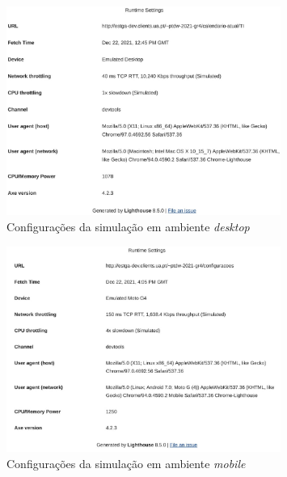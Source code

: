 \documentclass[11pt, twoside]{report}
\begin{document}
			\begin{figure}[H] 
				\centering 							\includegraphics[width=0.8\textwidth,height=0.8\textheight,keepaspectratio]{image/acessibilityTests/testDesktop}
				\caption{Configurações da simulação em ambiente \textit{desktop}}
				
			\end{figure}
			\begin{figure}[H] 
				\centering 							\includegraphics[width=0.8\textwidth,height=0.8\textheight,keepaspectratio]{image/acessibilityTests/testMobile}
				\caption{Configurações da simulação em ambiente \textit{mobile}}
			\end{figure}
	
\end{document}
